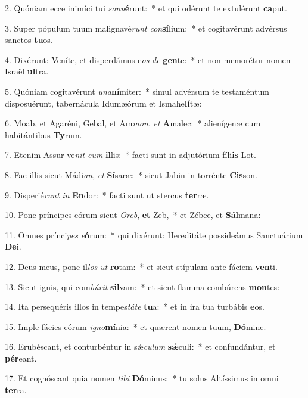 2. Quóniam ecce inimíci tui \textit{so}\textit{nu}\textbf{é}runt:~*  et qui odérunt te extulérunt \textbf{ca}put.\

3. Super pópulum tuum malignavé\textit{runt} \textit{con}\textbf{sí}lium:~*  et cogitavérunt advérsus sanctos \textbf{tu}os.\

4. Dixérunt: Veníte, et disperdámus e\textit{os} \textit{de} \textbf{gen}te:~*  et non memorétur nomen Israël \textbf{ul}tra.\

5. Quóniam cogitavérunt \textit{u}\textit{na}\textbf{ní}miter:~*  simul advérsum te testaméntum disposuérunt, tabernácula Idumæórum et Ismahe\textbf{lí}tæ:\

6. Moab, et Agaréni, Gebal, et Am\textit{mon}, \textit{et} \textbf{A}malec:~*  alienígenæ cum habitántibus \textbf{Ty}rum.\

7. Etenim Assur ve\textit{nit} \textit{cum} \textbf{il}lis:~*  facti sunt in adjutórium fíli\textbf{is} Lot.\

8. Fac illis sicut Mádi\textit{an}, \textit{et} \textbf{Sí}saræ:~*  sicut Jabin in torrénte \textbf{Cis}son.\

9. Disperié\textit{runt} \textit{in} \textbf{En}dor:~*  facti sunt ut stercus \textbf{ter}ræ.\

10. Pone príncipes eórum sicut \textit{O}\textit{reb}, \textbf{et} Zeb,~*  et Zébee, et \textbf{Sál}mana:\

11. Omnes prínci\textit{pes} \textit{e}\textbf{ó}rum:~*  qui dixérunt: Hereditáte possideámus Sanctuárium \textbf{De}i.\

12. Deus meus, pone il\textit{los} \textit{ut} \textbf{ro}tam:~*  et sicut stípulam ante fáciem \textbf{ven}ti.\

13. Sicut ignis, qui com\textit{bú}\textit{rit} \textbf{sil}vam:~*  et sicut flamma combúrens \textbf{mon}tes:\

14. Ita persequéris illos in tempes\textit{tá}\textit{te} \textbf{tu}a:~*  et in ira tua turbábis \textbf{e}os.\

15. Imple fácies eórum \textit{i}\textit{gno}\textbf{mí}nia:~*  et quærent nomen tuum, \textbf{Dó}mine.\

16. Erubéscant, et conturbéntur in sǽ\textit{cu}\textit{lum} \textbf{sǽ}culi:~*  et confundántur, et \textbf{pér}eant.\

17. Et cognóscant quia nomen \textit{ti}\textit{bi} \textbf{Dó}minus:~*  tu solus Altíssimus in omni \textbf{ter}ra.\

